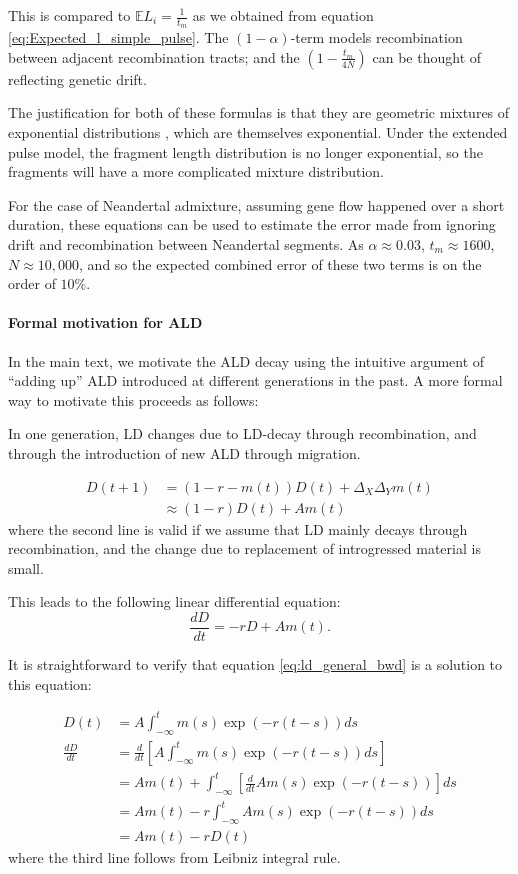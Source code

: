 \documentclass[11pt]{article}
\let\oldparagraph\paragraph
\renewcommand{\paragraph}[1]{\oldparagraph{#1}\mbox{}}
\begin{document}
This is compared to $\mathbb{E}L_i = \frac{1}{t_m}$ as we obtained from equation \ref{eq:Expected_l_simple_pulse}.
The $(1-\alpha)$-term models recombination between adjacent recombination tracts; and the $\left(1-\frac{t_m}{4N}\right)$ can be thought of reflecting genetic drift. 

The justification for both of these formulas is that they are geometric mixtures of exponential distributions \cite{liang_lengths_2014}, which are themselves exponential. Under the extended pulse model, the fragment length distribution is no longer exponential, so the fragments will have a more complicated mixture distribution. 

For the case of Neandertal admixture, assuming gene flow happened over a short duration, these equations can be used to estimate the error made from ignoring drift and recombination between Neandertal segments. As $\alpha \approx 0.03$, $t_m \approx 1600$, $N \approx 10,000$, and so the expected combined error of these two terms is on the order of $10\%$.
\paragraph{Formal motivation for ALD}
In the main text, we motivate the ALD decay using the intuitive argument of ``adding up'' ALD introduced at different generations in the past. A more formal way to motivate this proceeds as follows:

In one generation, LD changes due to LD-decay through recombination, and through the introduction of new ALD through migration.

\begin{align}
    D(t+1) &= (1-r-m(t)) D(t) + \Delta_X \Delta_Y m(t)\nonumber\\
    &\approx (1-r) D(t) + A m(t)
\end{align}
where the second line is valid if we assume that LD mainly decays through recombination, and the change due to replacement of introgressed material is small.

This leads to the following linear differential equation:
\begin{equation}
    \frac{dD}{dt} = -r D + A m(t)\text{.}
\end{equation}

It is straightforward to verify that equation \ref{eq:ld_general_bwd} is a solution to this equation:

\begin{align}
   D(t) &= A\int_{-\infty}^t m(s)\exp(-r(t-s)) ds \nonumber \\
   \frac{d D}{dt} &= \frac{d}{dt}\left[ A\int_{-\infty}^t m(s)\exp(-r(t-s)) ds \right]\nonumber\\
   &= A m(t) + \int_{-\infty}^t \left[\frac{d}{dt}A m(s)\exp(-r(t-s))\right]ds \nonumber\\
   &= A m(t) - r \int_{-\infty}^t A m(s)\exp(-r(t-s))ds \nonumber\\
   &= A m(t) -r D(t) 
  \end{align}
where the third line follows from Leibniz integral rule.
\end{document}
